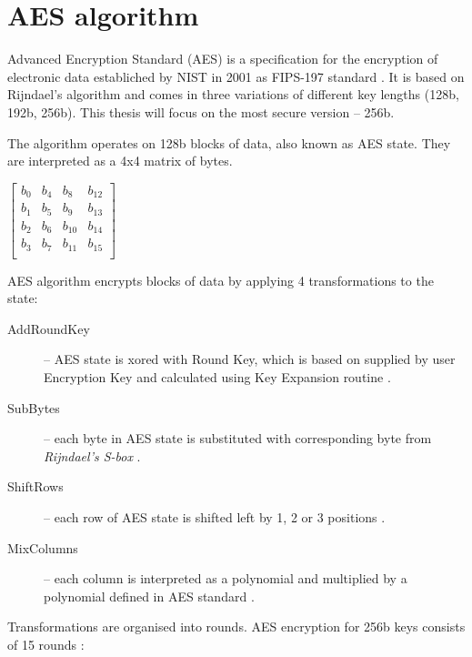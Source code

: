 \section{AES algorithm}
\label{sec:aes-algorithm}
Advanced Encryption Standard (AES) is a specification for the encryption of electronic data establiched by NIST in 2001 as FIPS-197 standard \cite{aes-standard}. It is based on Rijndael's algorithm and comes in three variations of different key lengths (128b, 192b, 256b). This thesis will focus on the most secure version -- 256b.

The algorithm operates on 128b blocks of data, also known as AES state. They are interpreted as a 4x4 matrix of bytes.

\begin{center}
$\begin{bmatrix}
b_0 & b_4 & b_8    & b_{12} \\
b_1 & b_5 & b_9    & b_{13} \\
b_2 & b_6 & b_{10} & b_{14} \\
b_3 & b_7 & b_{11} & b_{15} \\
\end{bmatrix}$
\end{center}

AES algorithm encrypts blocks of data by applying 4 transformations to the state:

\begin{description}
\item[AddRoundKey] -- AES state is xored with Round Key, which is based on supplied by user Encryption Key and calculated using Key Expansion routine \cite[Fig. 10, 11]{aes-standard}.
\item[SubBytes] -- each byte in AES state is substituted with corresponding byte from \textit{Rijndael's S-box} \cite[Fig. 7]{aes-standard}.
\item[ShiftRows] -- each row of AES state is shifted left by 1, 2 or 3 positions \cite[Fig. 8]{aes-standard}.
\item[MixColumns] -- each column is interpreted as a polynomial and multiplied by a polynomial defined in AES standard \cite[Fig. 9]{aes-standard}.
\end{description}

Transformations are organised into rounds. AES encryption for 256b keys consists of 15 rounds \cite[Fig. 5]{aes-standard}:


